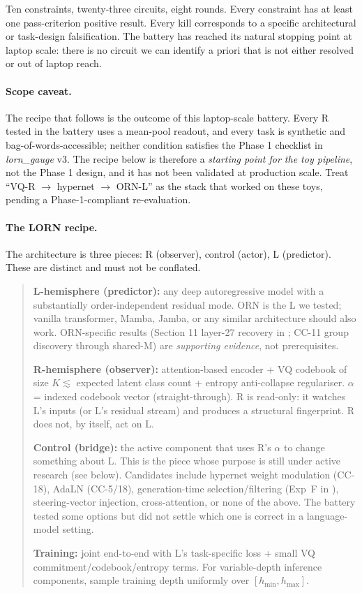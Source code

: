 \documentclass[10pt, twocolumn, a4paper]{article}
\begin{document}
Ten constraints, twenty-three circuits, eight rounds. Every constraint has at least one pass-criterion positive result. Every kill corresponds to a specific architectural or task-design falsification. The battery has reached its natural stopping point at laptop scale: there is no circuit we can identify a priori that is not either resolved or out of laptop reach.

\paragraph{Scope caveat.}
The recipe that follows is the outcome of this laptop-scale battery. Every R tested in the battery uses a mean-pool readout, and every task is synthetic and bag-of-words-accessible; neither condition satisfies the Phase 1 checklist in \emph{lorn\_gauge} v3. The recipe below is therefore a \emph{starting point for the toy pipeline}, not the Phase 1 design, and it has not been validated at production scale. Treat ``VQ-R $\to$ hypernet $\to$ ORN-L'' as the stack that worked on these toys, pending a Phase-1-compliant re-evaluation.

\paragraph{The LORN recipe.}
The architecture is three pieces: R (observer), control (actor), L (predictor). These are distinct and must not be conflated.

\begin{quote}
\textbf{L-hemisphere (predictor):} any deep autoregressive model with a substantially order-independent residual mode. ORN is the L we tested; vanilla transformer, Mamba, Jamba, or any similar architecture should also work. ORN-specific results (Section 11 layer-27 recovery in \cite{gauge-v2}; CC-11 group discovery through shared-M) are \emph{supporting evidence}, not prerequisites.

\textbf{R-hemisphere (observer):} attention-based encoder + VQ codebook of size $K \lesssim$ expected latent class count + entropy anti-collapse regulariser. $\alpha$ = indexed codebook vector (straight-through). R is read-only: it watches L's inputs (or L's residual stream) and produces a structural fingerprint. R does not, by itself, act on L.

\textbf{Control (bridge):} the active component that uses R's $\alpha$ to change something about L. This is the piece whose purpose is still under active research (see below). Candidates include hypernet weight modulation (CC-18), AdaLN (CC-5/18), generation-time selection/filtering (Exp~F in \cite{gauge-v2}), steering-vector injection, cross-attention, or none of the above. The battery tested some options but did not settle which one is correct in a language-model setting.

\textbf{Training:} joint end-to-end with L's task-specific loss + small VQ commitment/codebook/entropy terms. For variable-depth inference components, sample training depth uniformly over $[h_{\min}, h_{\max}]$.
\end{quote}
\end{document}
